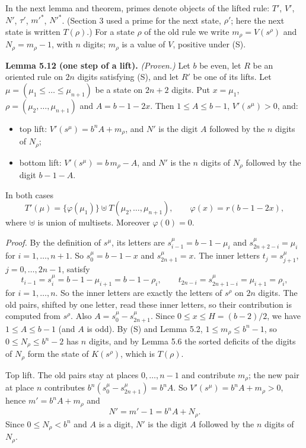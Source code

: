 \documentclass[11pt,letterpaper]{article}
\providecommand{\tightlist}{%
  \setlength{\itemsep}{0pt}\setlength{\parskip}{0pt}}
\theoremstyle{paperstyle}
\theoremstyle{paperstyledef}
\theoremstyle{paperstylerem}
\begin{document}
In the next lemma and theorem, primes denote objects of the lifted rule: \(T'\), \(V'\), \(N'\), \(\tau'\), \(m'^*\), \(N'^*\). (Section 3 used a prime for the next state, \(\rho'\); here the next state is written \(T(\rho)\).) For a state \(\rho\) of the old rule we write \(m_\rho = V(s^\rho)\) and \(N_\rho = m_\rho - 1\), with \(n\) digits; \(m_\rho\) is a value of \(V\), positive under (S).

\textbf{Lemma 5.12 (one step of a lift).} \emph{(Proven.)} Let \(b\) be even, let \(R\) be an oriented rule on \(2n\) digits satisfying (S), and let \(R'\) be one of its lifts. Let \(\mu = (\mu_1 \le \dots \le \mu_{n+1})\) be a state on \(2n+2\) digits. Put \(x = \mu_1\), \(\rho = (\mu_2, \dots, \mu_{n+1})\) and \(A = b - 1 - 2x\). Then \(1 \le A \le b-1\), \(V'(s^\mu) > 0\), and:

\begin{itemize}
\tightlist
\item
  top lift: \(V'(s^\mu) = b^n A + m_\rho\), and \(N'\) is the digit \(A\) followed by the \(n\) digits of \(N_\rho\);
\item
  bottom lift: \(V'(s^\mu) = b\, m_\rho - A\), and \(N'\) is the \(n\) digits of \(N_\rho\) followed by the digit \(b-1-A\).
\end{itemize}

In both cases \[T'(\mu) = \{\varphi(\mu_1)\} \uplus T(\mu_2, \dots, \mu_{n+1}), \qquad \varphi(x) = r(b - 1 - 2x), \tag{$*$}\] where \(\uplus\) is union of multisets. Moreover \(\varphi(0) = 0\).

\emph{Proof.} By the definition of \(s^\mu\), its letters are \(s^\mu_{i-1} = b - 1 - \mu_i\) and \(s^\mu_{2n+2-i} = \mu_i\) for \(i = 1, \dots, n+1\). So \(s^\mu_0 = b-1-x\) and \(s^\mu_{2n+1} = x\). The inner letters \(t_j = s^\mu_{j+1}\), \(j = 0, \dots, 2n-1\), satisfy \[t_{i-1} = s^\mu_i = b - 1 - \mu_{i+1} = b-1-\rho_i, \qquad t_{2n-i} = s^\mu_{2n+1-i} = \mu_{i+1} = \rho_i,\] for \(i = 1, \dots, n\). So the inner letters are exactly the letters of \(s^\rho\) on \(2n\) digits. The old pairs, shifted by one letter, read these inner letters, so their contribution is computed from \(s^\rho\). Also \(A = s^\mu_0 - s^\mu_{2n+1}\). Since \(0 \le x \le H = (b-2)/2\), we have \(1 \le A \le b-1\) (and \(A\) is odd). By (S) and Lemma 5.2, \(1 \le m_\rho \le b^n - 1\), so \(0 \le N_\rho \le b^n - 2\) has \(n\) digits, and by Lemma 5.6 the sorted deficits of the digits of \(N_\rho\) form the state of \(K(s^\rho)\), which is \(T(\rho)\).

Top lift. The old pairs stay at places \(0, \dots, n-1\) and contribute \(m_\rho\); the new pair at place \(n\) contributes \(b^n (s^\mu_0 - s^\mu_{2n+1}) = b^n A\). So \(V'(s^\mu) = b^n A + m_\rho > 0\), hence \(m' = b^n A + m_\rho\) and \[N' = m' - 1 = b^n A + N_\rho.\] Since \(0 \le N_\rho < b^n\) and \(A\) is a digit, \(N'\) is the digit \(A\) followed by the \(n\) digits of \(N_\rho\).
\end{document}
